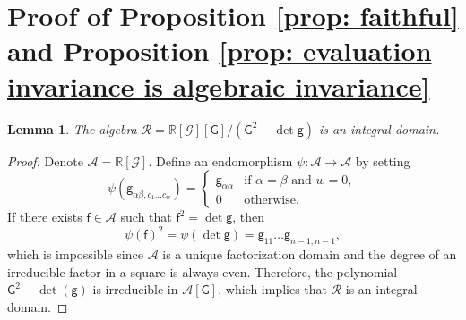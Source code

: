 \documentclass[11pt]{amsart}
\newtheorem{lemma}[theorem]{Lemma}
\theoremstyle{definition}
\numberwithin{equation}{section}
\begin{document}
\appendix  


\section{Proof of Proposition \ref{prop: faithful} and Proposition \ref{prop: evaluation invariance is algebraic invariance}}
\label{apd: invariance}

\begin{lemma}
    \label{lem: R is integral}
    The algebra $\mathcal R = \mathbb R[\mathcal G][\mathsf G]/(\mathsf G^2-\det\mathsf g)$ is an integral domain.
\end{lemma}
\begin{proof}
    Denote $\mathcal A = \mathbb R[\mathcal G]$. Define an endomorphism $\psi: \mathcal A\to \mathcal A$ by setting
    \[\psi(\mathsf g_{\alpha\beta,c_1\dots c_w}) = \begin{cases}
        \mathsf g_{\alpha\alpha} & \text{if $\alpha = \beta$ and $w=0$},\\
        0 & \text{otherwise.}
    \end{cases}\]
    If there exists $\mathsf f\in\mathcal A$ such that $\mathsf f^2 = \det\mathsf g$, then 
    \[\psi(\mathsf f)^2 = \psi(\det\mathsf g) = \mathsf g_{11}\dots\mathsf g_{n-1,n-1},\] 
    which is impossible since $\mathcal A$ is a unique factorization domain and the degree of an irreducible factor in a square is always even. Therefore, the polynomial $\mathsf G^2 - \det(\mathsf g)$ is irreducible in $\mathcal A[\mathsf G]$, which implies that $\mathcal R$ is an integral domain.
\end{proof}
\end{document}

